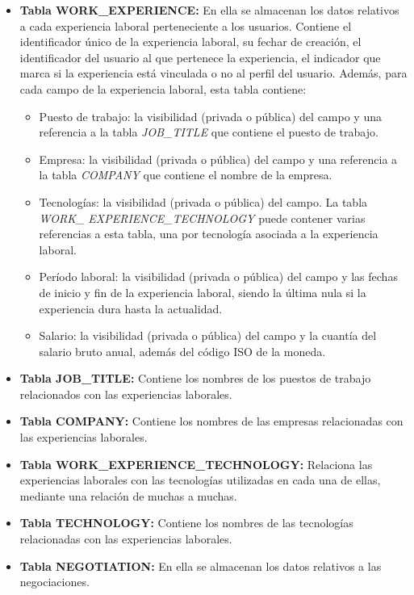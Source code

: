 \documentclass[a4paper, 12pt]{book}
\begin{document}
    \begin{itemize}
        \item \textbf{Tabla WORK\_EXPERIENCE:} En ella se almacenan los datos relativos a cada experiencia laboral perteneciente a los usuarios.
        Contiene el identificador único de la experiencia laboral, su fechar de creación,
        el identificador del usuario al que pertenece la experiencia,
        el indicador que marca si la experiencia está vinculada o no al perfil del usuario.
        Además, para cada campo de la experiencia laboral, esta tabla contiene:
        \begin{itemize}
            \item Puesto de trabajo: la visibilidad (privada o pública) del campo y una referencia a la tabla \emph{JOB\_TITLE} que contiene el puesto de trabajo.
            \item Empresa: la visibilidad (privada o pública) del campo y una referencia a la tabla \emph{COMPANY} que contiene el nombre de la empresa.
            \item Tecnologías: la visibilidad (privada o pública) del campo. La tabla \emph{WORK\_ EXPERIENCE\_TECHNOLOGY} puede contener varias referencias a esta tabla, una por tecnología asociada a la experiencia laboral.
            \item Período laboral: la visibilidad (privada o pública) del campo y las fechas de inicio y fin de la experiencia laboral, siendo la última nula si la experiencia dura hasta la actualidad.
            \item Salario: la visibilidad (privada o pública) del campo y la cuantía del salario bruto anual, además del código ISO de la moneda.
        \end{itemize}
        \item \textbf{Tabla JOB\_TITLE:} Contiene los nombres de los puestos de trabajo relacionados con las experiencias laborales.
        \item \textbf{Tabla COMPANY:} Contiene los nombres de las empresas relacionadas con las experiencias laborales.
        \item \textbf{Tabla WORK\_EXPERIENCE\_TECHNOLOGY:} Relaciona las experiencias laborales con las tecnologías utilizadas en cada una de ellas, mediante una relación de muchas a muchas.
        \item \textbf{Tabla TECHNOLOGY:} Contiene los nombres de las tecnologías relacionadas con las experiencias laborales.
        \item \textbf{Tabla NEGOTIATION:} En ella se almacenan los datos relativos a las negociaciones.

\end{itemize}
\end{document}
